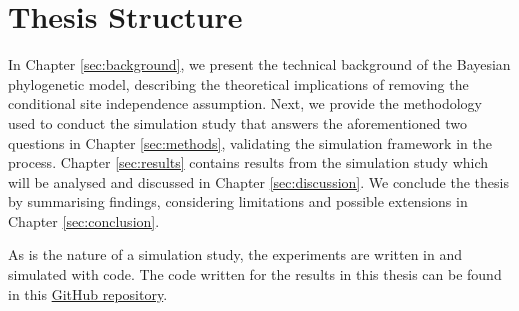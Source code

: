 \section{Thesis Structure}
In Chapter \ref{sec:background}, we present the technical background of the Bayesian phylogenetic model, describing the theoretical implications of removing the conditional site independence assumption. Next, we provide the methodology used to conduct the simulation study that answers the aforementioned two questions in Chapter \ref{sec:methods}, validating the simulation framework in the process. Chapter \ref{sec:results} contains results from the simulation study which will be analysed and discussed in Chapter \ref{sec:discussion}. We conclude the thesis by summarising findings, considering limitations and possible extensions in Chapter \ref{sec:conclusion}.

As is the nature of a simulation study, the experiments are written in and simulated with code. The code written for the results in this thesis can be found in this \hyperlink{https://github.com/jaamestaay/M4R}{GitHub repository}.